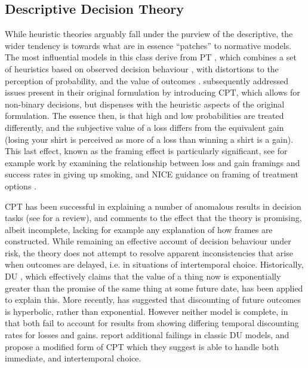 \subsection{Descriptive Decision Theory}\label{sub:descriptive_theories}

While heuristic theories arguably fall under the purview of the descriptive, the wider tendency is towards what are in essence \enquote{patches} to normative models. The most influential models in this class derive from \ac{PT} \citep{Kahneman1979}, which combines a set of heuristics based on observed decision behaviour \citep{Tversky1974}, with distortions to the perception of probability, and the value of outcomes \citep{Kahneman1984,Tversky1986}. \citet{Tversky1992} subsequently addressed issues present in their original formulation by introducing \ac{CPT}, which allows for non-binary decisions, but dispenses with the heuristic aspects of the original formulation. The essence then, is that high and low probabilities are treated differently, and the subjective value of a loss differs from the equivalent gain (losing your shirt is perceived as more of a loss than winning a shirt is a gain).
This last effect, known as the framing effect is particularly significant, see for example work by \citet{Toll2007} examining the relationship between loss and gain framings and success rates in giving up smoking, and \ac{NICE} guidance on framing of treatment options \citep{NICE2007}.

\ac{CPT} has been successful in explaining a number of anomalous results in decision tasks (see \citet{Camerer2004a} for a review), and \citet{Thaler2000} comments to the effect that the theory is promising, albeit incomplete, lacking for example any explanation of how frames are constructed. While remaining an effective account of decision behaviour under risk, the theory does not attempt to resolve apparent inconsistencies that arise when outcomes are delayed, i.e. in situations of intertemporal choice. Historically, \ac{DU} \citep{Samuelson1937}, which effectively claims that the value of a thing now is exponentially greater than the promise of the same thing at some future date, has been applied to explain this. More recently, \citet{Ainslie1991} has suggested that discounting of future outcomes is hyperbolic, rather than exponential. However neither model is complete, in that both fail to account for results from \citet{Thaler1981} showing differing temporal discounting rates for losses and gains. \citet{Loewenstein1992} report additional failings in classic \ac{DU} models, and propose a modified form of \ac{CPT} which they suggest is able to handle both immediate, and intertemporal choice.